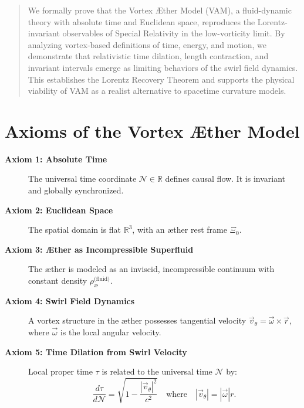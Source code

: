 \documentclass[11pt]{article}
\begin{document}
    \titlepageOpen

    \begin{abstract}
        We formally prove that the Vortex Æther Model (VAM), a fluid-dynamic theory with absolute time and Euclidean space, reproduces the Lorentz-invariant observables of Special Relativity in the low-vorticity limit. By analyzing vortex-based definitions of time, energy, and motion, we demonstrate that relativistic time dilation, length contraction, and invariant intervals emerge as limiting behaviors of the swirl field dynamics. This establishes the Lorentz Recovery Theorem and supports the physical viability of VAM as a realist alternative to spacetime curvature models.


    \end{abstract}

    \titlepageClose
    \fi

    \ifdefined\standalonechapter
    \section{\papertitle}
    \else
    \fi

    \section{Axioms of the Vortex Æther Model}

    \begin{description}
        \item[\textbf{Axiom 1: Absolute Time}] The universal time coordinate \( \mathcal{N} \in \mathbb{R} \) defines causal flow. It is invariant and globally synchronized.

        \item[\textbf{Axiom 2: Euclidean Space}] The spatial domain is flat \( \mathbb{R}^3 \), with an æther rest frame \( \Xi_0 \).

        \item[\textbf{Axiom 3: Æther as Incompressible Superfluid}] The æther is modeled as an inviscid, incompressible continuum with constant density \( \rho_{\text{\ae}}^{\text{(fluid)}} \).

        \item[\textbf{Axiom 4: Swirl Field Dynamics}] A vortex structure in the æther possesses tangential velocity \( \vec{v}_\theta = \vec{\omega} \times \vec{r} \), where \( \vec{\omega} \) is the local angular velocity.

        \item[\textbf{Axiom 5: Time Dilation from Swirl Velocity}] Local proper time \( \tau \) is related to the universal time \( \mathcal{N} \) by:
        \[
            \frac{d\tau}{d\mathcal{N}} = \sqrt{1 - \frac{|\vec{v}_\theta|^2}{c^2}} \quad \text{where} \quad |\vec{v}_\theta| = |\vec{\omega}| r.
        \]
    \end{description}
\end{document}
